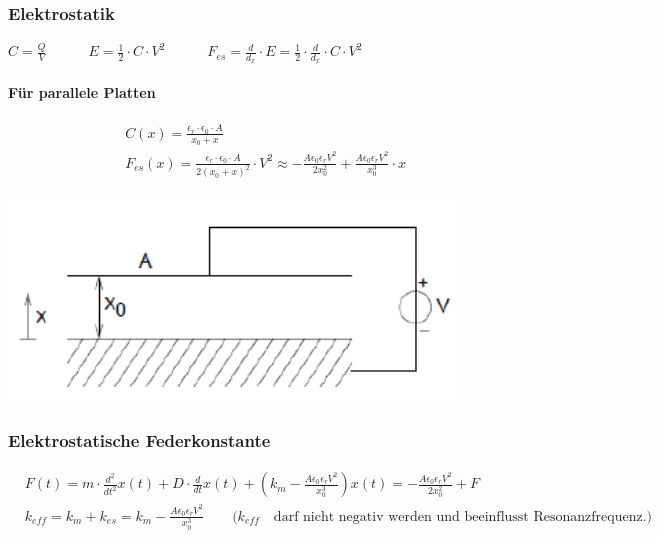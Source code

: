 \subsubsection{Elektrostatik}

    $C=\frac{Q}{V} \quad \quad \quad E=\frac{1}{2}\cdot C \cdot V^2 \quad \quad \quad F_{es}=\frac{d}{d_x}\cdot E = \frac{1}{2} \cdot \frac{d}{d_x} \cdot C \cdot V^2$
    
\paragraph{Für parallele Platten}
    \begin{minipage}{0.4\textwidth}
    \vspace{-1cm}
    \begin{equation*} 
      \begin{split} 
         &C(x)=\frac{\epsilon_r \cdot \epsilon_0 \cdot A}{x_0 + x} \\
         &F_{es}(x)=\frac{\epsilon_r \cdot \epsilon_0 \cdot A}{2(x_0+x)^2}\cdot V^2 \approx -\frac{A\epsilon_0\epsilon_r V^2}{2x_0^2}+\frac{A\epsilon_0\epsilon_r V^2}{x_0^3}\cdot x 
      \end{split} 
    \end{equation*}
    \end{minipage}
    \hfill
    \begin{minipage}{0.4\textwidth}
      \vspace{0pt}
      \includegraphics[width=0.9\textwidth]{images/Plattenkondens}
    \end{minipage}

\vspace{-0.5cm}
\subsubsection{Elektrostatische Federkonstante}
\vspace{-0.5cm}
    \begin{equation*} 
      \begin{split} 
        &F(t)=m\cdot \frac{d^2}{dt^2}x(t)+D \cdot \frac{d}{dt}x(t)+(k_m- \frac{A\epsilon_0\epsilon_r V^2}{x_0^3})x(t)= -\frac{A\epsilon_0\epsilon_r V^2}{2x_0^2}+F \\
        &k_{eff}=k_m+k_{es}=k_m- \frac{A\epsilon_0\epsilon_r V^2}{x_0^3} \quad \quad \text{(}k_{eff} \quad \text{darf nicht negativ werden und beeinflusst Resonanzfrequenz.)}\\
      \end{split} 
    \end{equation*}

